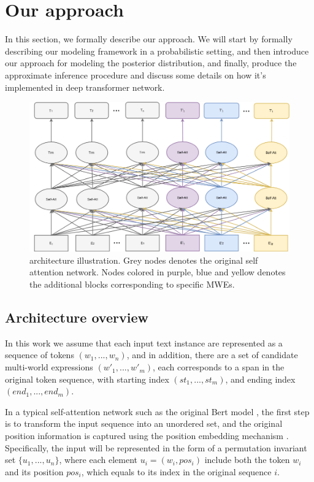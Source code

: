 

\section{Our approach}
In this section, we formally describe our \BertMWE approach.
We will start by formally describing our modeling framework in a probabilistic setting, 
and then introduce our approach for modeling the posterior distribution, 
and finally, produce the approximate inference procedure
and discuss some details on how it's implemented in deep transformer network.


\begin{figure}[tb]
    \centering
    \includegraphics[width=0.95\linewidth]{fig/architecture.png}
    \vspace{20pt}
    \caption{\BertMWE architecture illustration. Grey nodes denotes the original self attention network. Nodes colored in purple, blue and yellow denotes the additional blocks corresponding to specific MWEs.}
    \vspace{10pt}
    \label{fig:variational}
\end{figure}


\subsection{Architecture overview}\label{sec:arch-overview}
In this work we assume that each input text instance are represented as a sequence of tokens $(w_1, ..., w_n)$,
and in addition, there are a set of candidate multi-world expressions $(w'_1, ..., w'_m)$, each corresponds to a span in the original token sequence, with starting index $(st_1, ..., st_m)$, and ending index $(end_1, ..., end_m)$. 

In a typical self-attention network such as the original Bert model \cite{devlin2018bert}, the first step is to transform the input sequence into an unordered set, 
and the original position information is captured using the position embedding mechanism \cite{vaswani2017attention}. Specifically, the  input will be represented in the form of a permutation invariant set $\{u_1, ..., u_n\}$, where each element $u_i=(w_i, pos_i)$ include both the token $w_i$ and its position $pos_i$, which equals to its index in the original sequence $i$.

